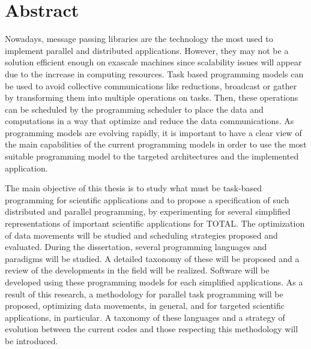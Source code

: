 \chapter*{Abstract}

Nowadays, message passing libraries are the technology the most used to implement parallel and distributed applications.
However, they may not be a solution efficient enough on exascale machines since scalability issues will appear due to the increase in computing resources.
Task based programming models can be used to avoid collective communications like reductions, broadcast or gather by transforming them into multiple operations on tasks.
Then, these operations can be scheduled by the programming scheduler to place the data and computations in a way that optimize and reduce the data communications.
As programming models are evolving rapidly, it is important to have a clear view of the main capabilities of the current programming models in order to use the most suitable programming model to the targeted architectures and the implemented application.

The main objective of this thesis is to study what must be task-based programming for scientific applications and to propose a specification of such distributed and parallel programming, by experimenting for several simplified representations of important scientific applications for TOTAL.
The optimization of data movements will be studied and scheduling strategies proposed and evaluated.
During the dissertation, several programming languages and paradigms will be studied.
A detailed taxonomy of these will be proposed and a review of the developments in the field will be realized.
Software will be developed using these programming models for each simplified applications.
As a result of this research, a methodology for parallel task programming will be proposed, optimizing data movements, in general, and for targeted scientific applications, in particular.
A taxonomy of these languages and a strategy of evolution between the current codes and those respecting this methodology will be introduced.
